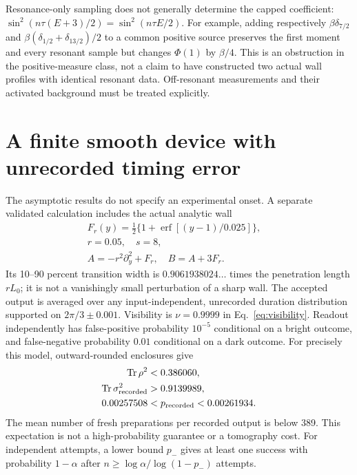 \documentclass[aps,pra,reprint,superscriptaddress,longbibliography]{revtex4-2}
\newcommand{\Tr}{\operatorname{Tr}}
\begin{document}
Resonance-only sampling does not generally determine the capped
coefficient: $\sin^2(n\tau(E+3)/2)=\sin^2(n\tau E/2)$. For example,
adding respectively $\beta\delta_{7/2}$ and
$\beta(\delta_{1/2}+\delta_{13/2})/2$ to a common positive source
preserves the first moment and every resonant sample but changes
$\Phi(1)$ by $\beta/4$. This is an obstruction in the positive-measure
class, not a claim to have constructed two actual wall profiles with
identical resonant data. Off-resonant measurements and their activated
background must be treated explicitly.

\section{A finite smooth device with unrecorded timing error}
\label{sec:finite}

The asymptotic results do not specify an experimental onset. A
separate validated calculation includes the actual analytic wall
\begin{equation}
 \begin{gathered}
 F_r(y)=\tfrac12\{1+\operatorname{erf}[(y-1)/0.025]\},\quad\\
 r=0.05,\quad s=8,\quad\\
 A=-r^2\partial_y^2+F_r,\quad B=A+3F_r.
                                                               \label{eq:erf}
 \end{gathered}
\end{equation}
Its 10--90 percent transition width is $0.9061938024\ldots$ times
the penetration length $rL_0$; it is not a vanishingly small
perturbation of a sharp wall. The accepted output is averaged over
any input-independent, unrecorded duration distribution supported
on $2\pi/3\pm0.001$. Visibility is $\nu=0.9999$ in
Eq.~\eqref{eq:visibility}. Readout independently has false-positive
probability $10^{-5}$ conditional on a bright outcome, and
false-negative probability $0.01$ conditional on a dark outcome.
For precisely this model, outward-rounded enclosures give
\begin{align}
 \Tr\rho^2&<0.386060,\nonumber\\
 \Tr\sigma_{\rm recorded}^2&>0.9139989,\label{eq:certificate}\\
 0.00257508&<p_{\rm recorded}<0.00261934.\nonumber
\end{align}
The mean number of fresh preparations per recorded output is below
389. This expectation is not a high-probability guarantee or a
tomography cost. For independent attempts, a lower bound $p_-$
gives at least one success with probability $1-\alpha$ after
$n\ge\log\alpha/\log(1-p_-)$ attempts.
\end{document}
